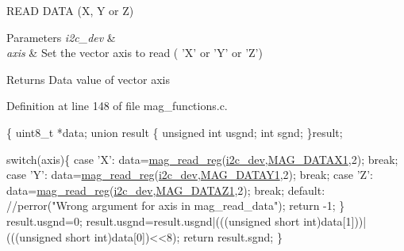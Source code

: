 R\-E\-A\-D D\-A\-T\-A (X, Y or Z) 


\begin{DoxyParams}{Parameters}
{\em i2c\-\_\-dev} & \\
\hline
{\em axis} & Set the vector axis to read ( 'X' or 'Y' or 'Z') \\
\hline
\end{DoxyParams}
\begin{DoxyReturn}{Returns}
Data value of vector axis 
\end{DoxyReturn}


Definition at line 148 of file mag\-\_\-functions.\-c.


\begin{DoxyCode}
\{
  uint8\_t *data;
  \textcolor{keyword}{union }result
  \{
    \textcolor{keywordtype}{unsigned} \textcolor{keywordtype}{int} usgnd;
    \textcolor{keywordtype}{int} sgnd;
  \}result;

  \textcolor{keywordflow}{switch}(axis)\{
    \textcolor{keywordflow}{case} \textcolor{charliteral}{'X'}:
      data=\hyperlink{group__mag_ga6830eaeae2298320e1e8c902e4edd709}{mag\_read\_reg}(\hyperlink{CommunicationV0_2communication_8c_a7751bd45ac1064efb35adf1f19c25db8}{i2c\_dev},\hyperlink{communication_2imu__regs_8h_a4f883328e7ae117996e334145ddd0032}{MAG\_DATAX1},2);
      \textcolor{keywordflow}{break};
    \textcolor{keywordflow}{case} \textcolor{charliteral}{'Y'}:
      data=\hyperlink{group__mag_ga6830eaeae2298320e1e8c902e4edd709}{mag\_read\_reg}(\hyperlink{CommunicationV0_2communication_8c_a7751bd45ac1064efb35adf1f19c25db8}{i2c\_dev},\hyperlink{communication_2imu__regs_8h_ae218906702b1e40c2b6970f97dd0cfe4}{MAG\_DATAY1},2);
      \textcolor{keywordflow}{break};
    \textcolor{keywordflow}{case} \textcolor{charliteral}{'Z'}:
      data=\hyperlink{group__mag_ga6830eaeae2298320e1e8c902e4edd709}{mag\_read\_reg}(\hyperlink{CommunicationV0_2communication_8c_a7751bd45ac1064efb35adf1f19c25db8}{i2c\_dev},\hyperlink{communication_2imu__regs_8h_a81d7d9236ec69a1a229e4fa7c6299fde}{MAG\_DATAZ1},2);
      \textcolor{keywordflow}{break};
    \textcolor{keywordflow}{default}:
      \textcolor{comment}{//perror("Wrong argument for axis in mag\_read\_data");}
      \textcolor{keywordflow}{return} -1;
  \}
  result.usgnd=0;
  result.usgnd=result.usgnd|(((\textcolor{keywordtype}{unsigned} \textcolor{keywordtype}{short} int)data[1]))|(((\textcolor{keywordtype}{unsigned} \textcolor{keywordtype}{short} \textcolor{keywordtype}{
      int})data[0])<<8);
  \textcolor{keywordflow}{return} result.sgnd;
\}
\end{DoxyCode}
